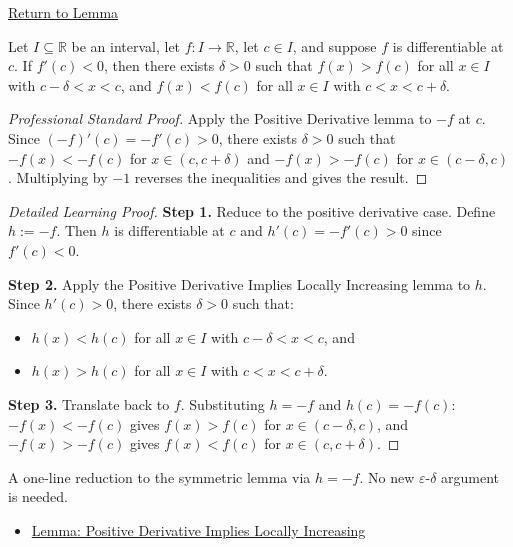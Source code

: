 \newpage
{}
\label{prf:negative-derivative-implies-locally-decreasing}

\begin{remark*}[Return]
\hyperref[lem:negative-derivative-implies-locally-decreasing]{Return to Lemma}
\end{remark*}

\begin{lemma*}
Let $I \subseteq \mathbb{R}$ be an interval, let $f : I \to \mathbb{R}$, let $c \in I$, and suppose $f$ is differentiable at $c$. If $f'(c) < 0$, then there exists $\delta > 0$ such that $f(x) > f(c)$ for all $x \in I$ with $c - \delta < x < c$, and $f(x) < f(c)$ for all $x \in I$ with $c < x < c + \delta$.
\end{lemma*}

\begin{proof}[Professional Standard Proof]
\LRAProofBodyStart
Apply the Positive Derivative lemma to $-f$ at $c$. Since $(-f)'(c) = -f'(c) > 0$, there exists $\delta > 0$ such that $-f(x) < -f(c)$ for $x \in (c,c+\delta)$ and $-f(x) > -f(c)$ for $x \in (c-\delta,c)$. Multiplying by $-1$ reverses the inequalities and gives the result.
\end{proof}

\begin{proof}[Detailed Learning Proof]
\LRAProofBodyStart

\textbf{Step 1.} Reduce to the positive derivative case. Define $h := -f$. Then $h$ is differentiable at $c$ and $h'(c) = -f'(c) > 0$ since $f'(c) < 0$.

\textbf{Step 2.} Apply the Positive Derivative Implies Locally Increasing lemma to $h$. Since $h'(c) > 0$, there exists $\delta > 0$ such that:
\begin{itemize}
  \item $h(x) < h(c)$ for all $x \in I$ with $c - \delta < x < c$, and
  \item $h(x) > h(c)$ for all $x \in I$ with $c < x < c + \delta$.
\end{itemize}

\textbf{Step 3.} Translate back to $f$. Substituting $h = -f$ and $h(c) = -f(c)$: $-f(x) < -f(c)$ gives $f(x) > f(c)$ for $x \in (c-\delta,c)$, and $-f(x) > -f(c)$ gives $f(x) < f(c)$ for $x \in (c,c+\delta)$.
\end{proof}

\begin{remark*}
A one-line reduction to the symmetric lemma via $h = -f$. No new $\varepsilon$-$\delta$ argument is needed.
\end{remark*}

\begin{dependencies}
\begin{itemize}
  \item \hyperref[lem:positive-derivative-implies-locally-increasing]{Lemma: Positive Derivative Implies Locally Increasing}
\end{itemize}
\end{dependencies}

\clearpage
